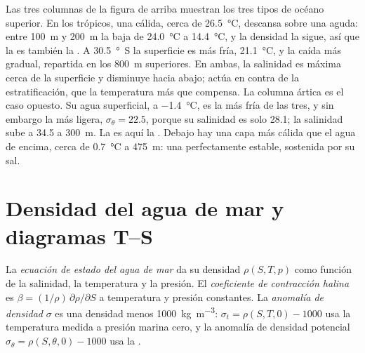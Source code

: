 Las tres columnas de la figura de arriba muestran los tres tipos de océano superior. En los trópicos, una  cálida, cerca de \qty{26.5}{\celsius}, descansa sobre una  aguda: entre \qty{100}{m} y \qty{200}{m} la  baja de \qty{24.0}{\celsius} a \qty{14.4}{\celsius}, y la densidad la sigue, así que la  es también la . A \qty{30.5}{\degree S} la superficie es más fría, \qty{21.1}{\celsius}, y la caída más gradual, repartida en los \qty{800}{m} superiores. En ambas, la salinidad es máxima cerca de la superficie y disminuye hacia abajo; actúa en contra de la estratificación, que la temperatura más que compensa. La columna ártica es el caso opuesto. Su agua superficial, a \qty{-1.4}{\celsius}, es la más fría de las tres, y sin embargo la más ligera, $\sigma_\theta = 22.5$, porque su salinidad es solo \num{28.1}; la salinidad sube a \num{34.5} a \qty{300}{m}. La  es aquí la . Debajo hay una capa más cálida que el agua de encima, cerca de \qty{0.7}{\celsius} a \qty{475}{m}: una  perfectamente estable, sostenida por su sal.

\section{Densidad del agua de mar y diagramas T--S}\label{sec:b1:fluid-envelopes-structure:ts}

\begin{definition}\label{def:b1:fluid-envelopes-structure:eos}
La \emph{ecuación de estado del agua de mar}
da su densidad $\rho(S, T, p)$ como función de la salinidad, la temperatura y la presión. El \emph{coeficiente de contracción halina} es $\beta = (1/\rho)\,\partial\rho/\partial S$ a temperatura y presión constantes. La \emph{anomalía de densidad}
$\sigma$ es una densidad menos \qty{1000}{kg.m^{-3}}: $\sigma_t = \rho(S, T, 0) -
1000$ usa la temperatura medida a presión marina cero, y la anomalía de densidad potencial $\sigma_\theta = \rho(S, \theta, 0) - 1000$ usa la .
\end{definition}

